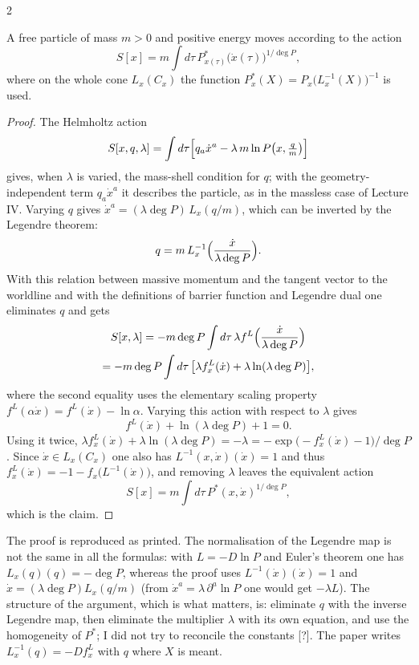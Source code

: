 \begin{paracol}{2}
\begin{theorem}\label{thm:c29-massivepart}
A free particle of mass $m>0$ and positive energy moves according to the action
\[
  S[x]=m\int d\tau\,P^*_{x(\tau)}\bigl(\dot x(\tau)\bigr)^{1/\deg P},
\]
where on the whole cone $L_x(C_x)$ the function $P^*_x(X)=P_x\bigl(L_x^{-1}(X)\bigr)^{-1}$ is used.
\end{theorem}
\begin{proof}
The Helmholtz action
\[
  S[x,q,\lambda]=\int d\tau\Bigl[q_a\dot x^a-\lambda\,m\ln P\bigl(x,\tfrac qm\bigr)\Bigr]
\]
gives, when $\lambda$ is varied, the mass-shell condition for $q$; with the geometry-independent term $q_a\dot x^a$ it describes the particle, as in the massless case of Lecture IV. Varying $q$ gives $\dot x^a=(\lambda\deg P)\,L_x(q/m)$, which can be inverted by the Legendre theorem:
\[
  q=m\,L_x^{-1}\Bigl(\frac{\dot x}{\lambda\deg P}\Bigr).
\]
With this relation between massive momentum and the tangent vector to the worldline and with the definitions of barrier function and Legendre dual one eliminates $q$ and gets
\begin{multline*}
  S[x,\lambda]=-m\deg P\int d\tau\,\lambda f^L\Bigl(\frac{\dot x}{\lambda\deg P}\Bigr)\\=-m\deg P\int d\tau\,\bigl[\lambda f^L_x(\dot x)+\lambda\ln(\lambda\deg P)\bigr],
\end{multline*}
where the second equality uses the elementary scaling property $f^L(\alpha\dot x)=f^L(\dot x)-\ln\alpha$. Varying this action with respect to $\lambda$ gives
\[
  f^L(\dot x)+\ln(\lambda\deg P)+1=0.
\]
Using it twice, $\lambda f^L_x(\dot x)+\lambda\ln(\lambda\deg P)=-\lambda=-\exp\bigl(-f^L_x(\dot x)-1\bigr)/\deg P$. Since $\dot x\in L_x(C_x)$ one also has $L^{-1}(x,\dot x)(\dot x)=1$ and thus $f^L_x(\dot x)=-1-f_x\bigl(L^{-1}(\dot x)\bigr)$, and removing $\lambda$ leaves the equivalent action
\[
  S[x]=m\int d\tau\,P^*(x,\dot x)^{1/\deg P},
\]
which is the claim.
\end{proof}
\begin{coursenote}
The proof is reproduced as printed. The normalisation of the Legendre map is not the same in all the formulas: with $L=-D\ln P$ and Euler's theorem one has $L_x(q)(q)=-\deg P$, whereas the proof uses $L^{-1}(\dot x)(\dot x)=1$ and $\dot x=(\lambda\deg P)L_x(q/m)$ (from $\dot x^a=\lambda\,\partial^a\ln P$ one would get $-\lambda L$). The structure of the argument, which is what matters, is: eliminate $q$ with the inverse Legendre map, then eliminate the multiplier $\lambda$ with its own equation, and use the homogeneity of $P^*$; I did not try to reconcile the constants [?]. The paper writes $L_x^{-1}(q)=-Df_x^L$ with $q$ where $X$ is meant.
\end{coursenote}


\end{paracol}
